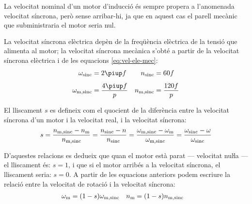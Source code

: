 La velocitat nominal d'un motor d'inducció és sempre propera a l'anomenada velocitat síncrona, però sense arribar-hi, ja que en aquest cas el parell mecànic que subministraria el motor seria nul.

La velocitat síncrona elèctrica depèn de la freqüència elèctrica de la tensió que alimenta al motor; la velocitat síncrona mecànica s'obté a partir de la velocitat síncrona elèctrica i de  les equacions \eqref{eq:vel-ele-mec}:
\begin{subequations}\index{motors d'inducció!velocitat síncrona}
\begin{align}
    \omega\ped{sinc} &= 2 \piup f & n\ped{sinc} &= 60 f \\[1ex]
    \omega\ped{m,sinc} &= \frac{4 \piup f}{p} & n\ped{m,sinc} &= \frac{120 f}{p}\label{eq:vel-mec-sinc}
\end{align}
\end{subequations}

El lliscament $s$ es defineix com el quocient de la diferència entre la velocitat síncrona d'un motor i la velocitat real, i la velocitat síncrona:
\begin{equation}\label{eq:lliscament}\index{lliscament}
    s = \frac{n\ped{m,sinc}-n\ped{m}}{n\ped{m,sinc}} =
    \frac{n\ped{sinc}-n}{n\ped{sinc}} =
    \frac{\omega\ped{m,sinc}-\omega\ped{m}}{\omega\ped{m,sinc}} =
    \frac{\omega\ped{sinc}-\omega}{\omega\ped{sinc}}
\end{equation}

D'aquestes relacions es dedueix que quan el motor està parat --- velocitat nuŀla --- el lliscament és: $s=1$, i que si el motor arribés a la velocitat síncrona, el lliscament seria: $s=0$. A partir de les equacions anteriors podem escriure la relació entre la velocitat de rotació i la velocitat síncrona:
\begin{align}
    \omega_\mathrm{m} &= (1-s) \omega_\mathrm{m,sinc} & n_\mathrm{m} &= (1-s) n_\mathrm{m,sinc} \label{eq:wm-wsinc}
\end{align}


